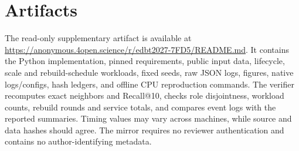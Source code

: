 \documentclass[sigconf]{acmart}
\begin{document}
\maketitle



\section{Artifacts}
The read-only supplementary artifact is available at
\url{https://anonymous.4open.science/r/edbt2027-7FD5/README.md}.
It contains the Python implementation, pinned requirements, public input data,
lifecycle, scale and rebuild-schedule workloads, fixed seeds, raw JSON logs, figures,
native logs/configs, hash ledgers, and offline CPU
reproduction commands. The verifier recomputes exact
neighbors and Recall@10, checks role disjointness, workload counts, rebuild rounds and
service totals, and compares event logs with the reported summaries. Timing values may
vary across machines, while source and data hashes should agree. The mirror requires no
reviewer authentication and contains no author-identifying metadata.

\renewcommand{\bibfont}{\tiny}


\label{sec:references}


\end{document}
